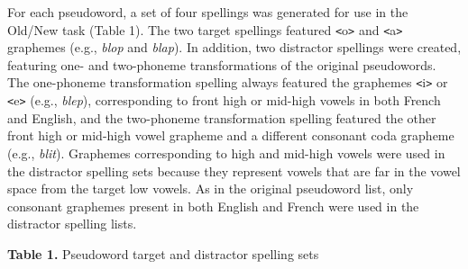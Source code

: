 \documentclass[
  english,
  man,floatsintext]{apa7}
\begin{document}
For each pseudoword, a set of four spellings was generated for use in the Old/New task (Table 1). The two target spellings featured \texttt{\textless{}}o\texttt{\textgreater{}} and \texttt{\textless{}}a\texttt{\textgreater{}} graphemes (e.g., \emph{blop} and \emph{blap}). In addition, two distractor spellings were created, featuring one- and two-phoneme transformations of the original pseudowords. The one-phoneme transformation spelling always featured the graphemes \texttt{\textless{}}i\texttt{\textgreater{}} or \texttt{\textless{}}e\texttt{\textgreater{}} (e.g., \emph{blep}), corresponding to front high or mid-high vowels in both French and English, and the two-phoneme transformation spelling featured the other front high or mid-high vowel grapheme and a different consonant coda grapheme (e.g., \emph{blit}). Graphemes corresponding to high and mid-high vowels were used in the distractor spelling sets because they represent vowels that are far in the vowel space from the target low vowels. As in the original pseudoword list, only consonant graphemes present in both English and French were used in the distractor spelling lists.

\textbf{Table 1.} Pseudoword target and distractor spelling sets
\end{document}
